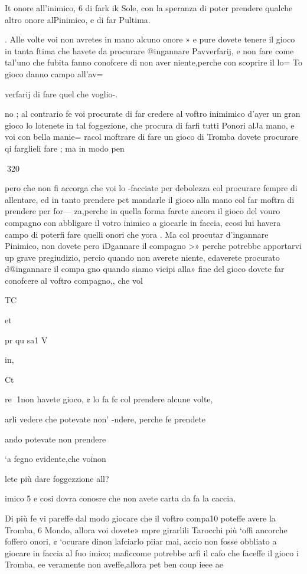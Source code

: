 \documentclass[12pt,a6paper]{article}
\begin{document}
It
onore all'inimico, 6 di fark ik
Sole, con la speranza di poter
prendere qualche altro onore
alPinimico, e di far Pultima.

. Alle volte voi non avretes
in mano alcuno onore » e pure
dovete tenere il gioco in tanta
ftima che havete da procurare
@ingannare Pavverfarij, e non
fare come tal’uno che fubita
fanno conofcere di non aver
niente,perche con scoprire il lo=
To gioco danno campo all’av=

verfarij di fare quel che voglio-.

no ; al contrario fe voi procurate di far credere al voftro inimimico d’ayer un gran gioco lo
lotenete in tal foggezione, che
procura di farfi tutti Ponori alJa mano, e voi con bella manie=
racol moftrare di fare un gioco di Tromba dovete procurare
qi farglieli fare ; ma in modo
pen

 
320

pero che non fi accorga che voi
lo -facciate per debolezza col
procurare fempre di allentare, ed in tanto prendere pct
mandarle il gioco alla mano col
far moftra di prendere per for—
za,perche in quella forma farete ancora il gioco del vouro
compagno con abbligare il votro inimico a giocarle in faccia, ¢cosi lui havera campo di
poterfi fare quelli onori che
yora .
Ma col procutar d’ingannare
Pinimico, non dovete pero iDgannare il compagno >» perche
potrebbe apportarvi up grave
pregiudizio, percio quando non
averete niente, edaverete procurato d@ingannare il compa
gno quando siamo vicipi alla»
fine del gioco dovete far conofcere al voftro compagno,, che
vol

 

TC

et

pr
qu
sa1
V

in,

Ct

re
1non havete gioco, ¢ lo fa
f¢ col prendere alcune volte,

arli vedere che potevate non’
-ndere, perche fe prendete

ando potevate non prendere

‘a fegno evidente,che voinon

lete più dare foggezzione all?

imico 5 e cosi dovra conosre che non avete carta da fa
la caccia.

Di più fe vi pareffe dal modo
giocare che il voftro compa10 poteffe avere la Tromba, 6
Mondo, allora voi dovete»
mpre girarlili Tarocchi più
‘offi ancorche foffero onori, ¢
‘ocurare dinon lafciarlo piiar mai, accio non fosse obbliato a giocare in faccia al fuo
imico; maficcome potrebbe
arfi il cafo che faceffe il gioco
i Tromba, ee veramente non
aveffe,allora pet ben coup ieee
ae
\end{document}
